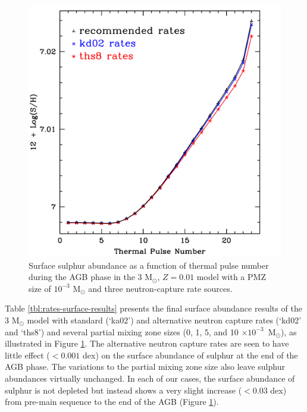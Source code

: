 \begin{figure}
 \begin{center}\includegraphics[width=\textwidth]{figures/m3z01-surfcomparerates-sulphur.pdf}\end{center}
 \caption{Surface sulphur abundance as a function of thermal pulse number during the AGB phase in the 3 M$_\odot$, $Z=0.01$ model with a PMZ size of $10^{-3}$ M$_\odot$ and three neutron-capture rate sources.}\label{fig:rate-results-s}
\end{figure}

Table \ref{tbl:rates-surface-results} presents the final surface abundance results of the 3 M$_\odot$ model with standard (`ka02') and alternative neutron capture rates (`kd02' and `ths8') and several partial mixing zone sizes (0, 1, 5, and 10 $\times 10^{-3}$~M$_\odot$), as illustrated in Figure \ref{fig:rate-results-s}. The alternative neutron capture rates are seen to have little effect ($<0.001$ dex) on the surface abundance of sulphur at the end of the AGB phase. The variations to the partial mixing zone size also leave sulphur abundances virtually unchanged. In each of our cases, the surface abundance of sulphur is not depleted but instead shows a very slight increase ($<0.03$ dex) from pre-main sequence to the end of the AGB (Figure \ref{fig:rate-results-s}). 

